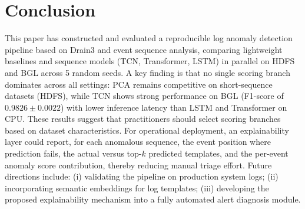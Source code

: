 \documentclass[conference]{IEEEtran}
\begin{document}
\section{Conclusion}
This paper has constructed and evaluated a reproducible log anomaly detection pipeline based on Drain3 and event sequence analysis, comparing lightweight baselines and sequence models (TCN, Transformer, LSTM) in parallel on HDFS and BGL across 5 random seeds. A key finding is that no single scoring branch dominates across all settings: PCA remains competitive on short-sequence datasets (HDFS), while TCN shows strong performance on BGL (F1-score of $0.9826 \pm 0.0022$) with lower inference latency than LSTM and Transformer on CPU. These results suggest that practitioners should select scoring branches based on dataset characteristics. For operational deployment, an explainability layer could report, for each anomalous sequence, the event position where prediction fails, the actual versus top-$k$ predicted templates, and the per-event anomaly score contribution, thereby reducing manual triage effort. Future directions include: (i) validating the pipeline on production system logs; (ii) incorporating semantic embeddings for log templates; (iii) developing the proposed explainability mechanism into a fully automated alert diagnosis module.
\end{document}

